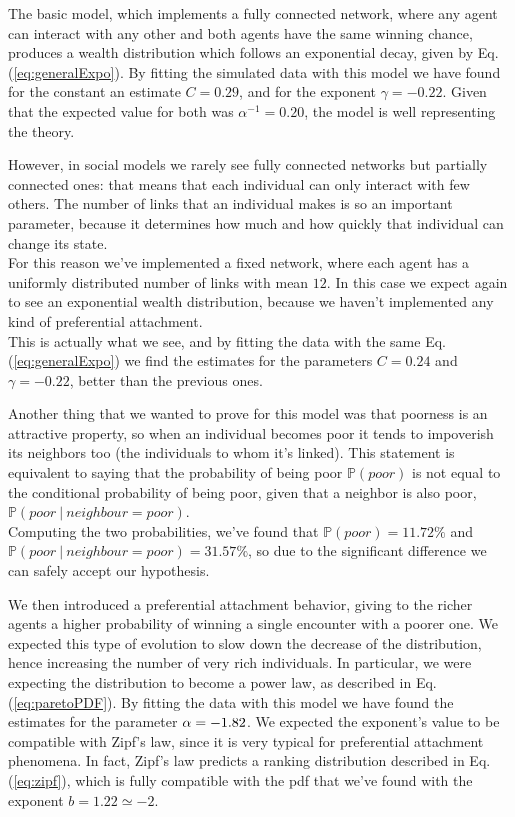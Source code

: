 The basic model, which implements a fully connected network, where any agent can interact with any other and both agents have the same winning chance, produces a wealth distribution which follows an exponential decay, given by Eq. (\ref{eq:generalExpo}).
By fitting the simulated data with this model we have found for the constant an estimate $C = 0.29$, and for the exponent $\gamma = -0.22$.
Given that the expected value for both was $\alpha^{-1} = 0.20$, the model is well representing the theory.

However, in social models we rarely see fully connected networks but partially connected ones: that means that each individual can only interact with few others.
The number of links that an individual makes is so an important parameter, because it determines how much and how quickly that individual can change its state. \\
For this reason we've implemented a fixed network, where each agent has a uniformly distributed number of links with mean $12$.
In this case we expect again to see an exponential wealth distribution, because we haven't implemented any kind of preferential attachment. \\
This is actually what we see, and by fitting the data with the same Eq. (\ref{eq:generalExpo}) we find the estimates for the parameters $C = 0.24$ and $\gamma = -0.22$, better than the previous ones.

Another thing that we wanted to prove for this model was that poorness is an attractive property, so when an individual becomes poor it tends to impoverish its neighbors too (the individuals to whom it's linked).
This statement is equivalent to saying that the probability of being poor $\mathbb{P}(poor)$ is not equal to the conditional probability of being poor, given that a neighbor is also poor, $\mathbb{P}(poor \ | \ neighbour=poor)$. \\
Computing the two probabilities, we've found that $\mathbb{P}(poor) = 11.72 \%$ and \\ $\mathbb{P}(poor \ | \ neighbour=poor) = 31.57 \%$, so due to the significant difference we can safely accept our hypothesis.

We then introduced a preferential attachment behavior, giving to the richer agents a higher probability of winning a single encounter with a poorer one.
We expected this type of evolution to slow down the decrease of the distribution, hence increasing the number of very rich individuals.
In particular, we were expecting the distribution to become a power law, as described in Eq. (\ref{eq:paretoPDF}).
By fitting the data with this model we have found the estimates for the parameter $\alpha = -1.82$.
We expected the exponent's value to be compatible with Zipf's law, since it is very typical for preferential attachment phenomena.
In fact, Zipf's law predicts a ranking distribution described in Eq. (\ref{eq:zipf}), which is fully compatible with the pdf that we've found with the exponent $b = 1.22 \simeq -2$.

